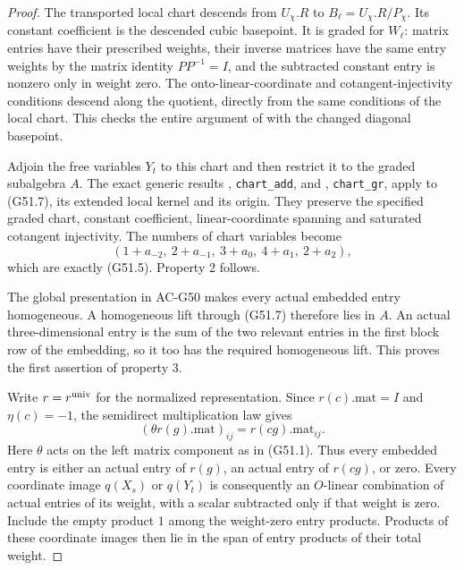 \begin{proof}
The transported local chart descends from $U_\chi.R$
to $B_\ell=U_\chi.R/P_\chi$.  Its constant coefficient
is the descended cubic basepoint.  It is graded for
$W_\ell$: matrix entries have their prescribed weights,
their inverse matrices have the same entry weights by the matrix
identity $PP^{-1}=I$, and the subtracted constant
entry is nonzero only in weight zero.
The onto-linear-coordinate and cotangent-injectivity
conditions descend along the quotient, directly from
the same conditions of the local chart.
This checks the entire argument of
with the changed diagonal basepoint.

Adjoin the free variables $Y_t$ to this chart and then
restrict it to the graded subalgebra $A$.
The exact generic results
, \texttt{chart\_add},
and ,
\texttt{chart\_gr}, apply to (G51.7), its extended local
kernel and its origin.  They preserve the specified
graded chart, constant coefficient, linear-coordinate
spanning and saturated cotangent injectivity.
The numbers of chart variables become
\[
 (1+a_{-2},\ 2+a_{-1},\ 3+a_0,\ 4+a_1,\ 2+a_2),
\]
which are exactly (G51.5).  Property 2 follows.

The global presentation in AC-G50 makes every actual
embedded entry homogeneous.  A homogeneous lift through
(G51.7) therefore lies in $A$.
An actual three-dimensional entry is the sum of the
two relevant entries in the first block row of the
embedding, so it too has the required homogeneous lift.
This proves the first assertion of property 3.

Write $r=r^{\rm univ}$ for the normalized representation.
Since $r(c).\mathrm{mat}=I$ and $\eta(c)=-1$, the
semidirect multiplication law gives
\[
                 (\theta r(g).\mathrm{mat})_{ij}
                                  =r(cg).\mathrm{mat}_{ij}.
                                                               \tag{G51.10}
\]
Here $\theta$ acts on the left matrix component as in
(G51.1).  Thus every embedded entry is either an actual
entry of $r(g)$, an actual entry of $r(cg)$, or zero.
Every coordinate image $q(X_s)$ or $q(Y_t)$ is consequently
an $O$-linear combination of actual entries of its weight,
with a scalar subtracted only if that weight is zero.
Include the empty product $1$ among the weight-zero
entry products.  Products of these coordinate images
then lie in the span of entry products of their total
weight.


\end{proof}
